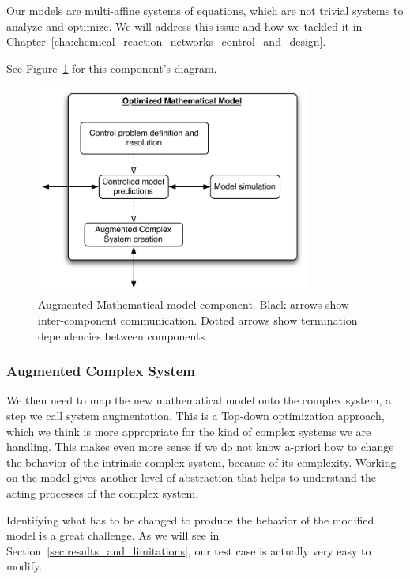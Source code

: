 Our models are multi-affine systems of equations, which are not trivial systems to analyze and optimize. We will address this issue and how we tackled it in Chapter~\ref{cha:chemical_reaction_networks_control_and_design}.

See Figure~\ref{fig:img_controlled_mathematical_model} for this component's diagram. 

\begin{figure}[h!]
	\centering
		\includegraphics[width=9cm]{img/controlled_mathematical_model.pdf}
	\caption{Augmented Mathematical model component. Black arrows show inter-component communication. Dotted arrows show termination dependencies between components.}
	\label{fig:img_controlled_mathematical_model}
\end{figure}
		

\subsubsection{Augmented Complex System} %
\label{ssub:augmented_complex_system}


We then need to map the new mathematical model onto the complex system, a step we call system augmentation. This is a Top-down optimization approach, which we think is more appropriate for the kind of complex systems we are handling. This makes even more sense if we do not know a-priori how to change the behavior of the intrinsic complex system, because of its complexity. Working on the model gives another level of abstraction that helps to understand the acting processes of the complex system.

Identifying what has to be changed to produce the behavior of the modified model is a great challenge. As we will see in Section~\ref{sec:results_and_limitations}, our test case is actually very easy to modify.

